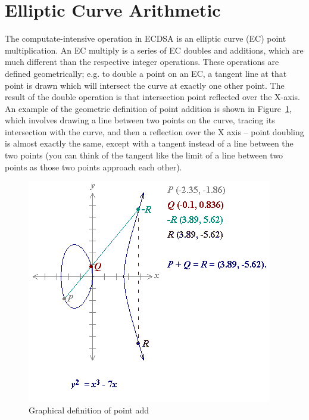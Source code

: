 \documentclass[twocolumn]{article}
\begin{document}
\section{Elliptic Curve Arithmetic}

The computate-intensive operation in ECDSA is an elliptic curve (EC)
point multiplication. An EC multiply is a series of EC doubles and
additions, which are much different than the respective integer
operations. These operations are defined geometrically; e.g. to double
a point on an EC, a tangent line at that point is drawn which will
intersect the curve at exactly one other point. The result of the
double operation is that intersection point reflected over the X-axis.
An example of the geometric definition of point addition is shown in
Figure~\ref{point-add-graph}, which involves drawing a line between
two points on the curve, tracing its intersection with the curve, and
then a reflection over the X axis -- point doubling is almost exactly
the same, except with a tangent instead of a line between the two
points (you can think of the tangent like the limit of a line between
two points as those two points approach each other).

\begin{figure}[ht]
  \begin{center}
    \includegraphics[width=0.9\linewidth]{point_add.png}
  \end{center}

  \caption{Graphical definition of point add
    \label{point-add-graph}}
\end{figure}
\end{document}
